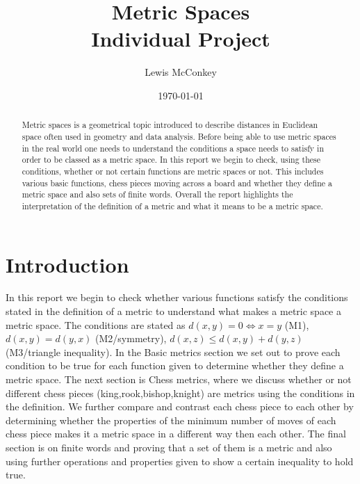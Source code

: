 \documentclass[,oneside]{article}
\author{Lewis McConkey}
\date{\today}
\title{ \LARGE{Metric Spaces} \\
          \hspace{16cm}Individual Project}
\numberwithin{equation}{section}
\begin{document}
\maketitle
 \begin{abstract} 
Metric spaces is a geometrical topic introduced to describe distances in Euclidean space often used in geometry and data analysis. Before being able to use metric spaces in the real world one needs to understand the conditions a space needs to satisfy in order to be classed as a metric space. In this report we begin to check, using these conditions, whether or not certain functions are metric spaces or not. This includes various basic functions, chess pieces moving across a board and whether they define a metric space and also sets of finite words. Overall the report highlights the interpretation of the definition of a metric and what it means to be a metric space.
 \end{abstract}
 \section{\large{Introduction}}
 In this report we begin to check whether various functions satisfy the conditions stated in the definition of a metric to understand what makes a metric space a metric space. The conditions are stated as $d(x,y)=0 \Leftrightarrow x=y$ (M1), $d(x,y)=d(y,x)$ (M2/symmetry), $d(x,z) \leq d(x,y) + d(y,z)$ (M3/triangle inequality). In the Basic metrics section we set out to prove each condition to be true for each function given to determine whether they define a metric space. The next section is Chess metrics, where we discuss whether or not different chess pieces (king,rook,bishop,knight) are metrics using the conditions in the definition. We further compare and contrast each chess piece to each other by determining whether the properties of the minimum number of moves of each chess piece makes it a metric space in a different way then each other. The final section is on finite words and proving that a set of them is a metric and also using further operations and properties given to show a certain inequality to hold true.
\end{document}
